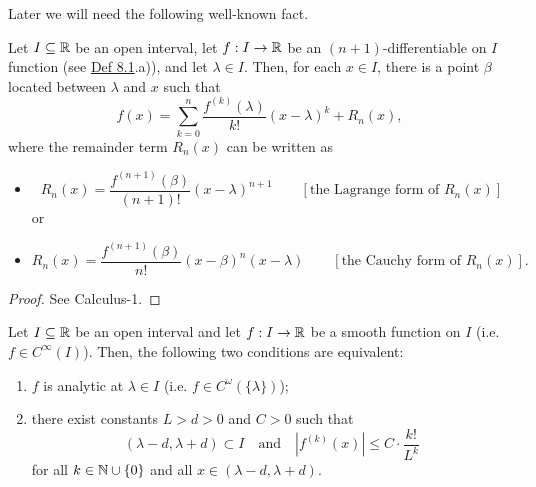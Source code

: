 Later we will need the following well-known fact.

\begin{claim}\label{claim:8.3}
Let $I\subseteq\mathbb{R}$ be an open interval, let $f:I\to\mathbb{R}$ be an $(n+1)$-differentiable on $I$ function (see \hyperref[def:8.1]{Def 8.1}.a)), and let $\lambda\in I$.
Then, for each $x\in I$, there is a point $\beta$ located between $\lambda$ and $x$ such that
\[
f(x)=\sum_{k=0}^{n}\frac{f^{(k)}(\lambda)}{k!}(x-\lambda)^k+R_n(x),
\tag{5}\label{eq:8:5:1}
\]
where the remainder term $R_n(x)$ can be written as
\begin{itemize}
    \item
    \[
    R_n(x)=\frac{f^{(n+1)}(\beta)}{(n+1)!}(x-\lambda)^{n+1}
    \qquad [\text{the Lagrange form of }R_n(x)]
    \]
    or
    \item
    \[
    R_n(x)=\frac{f^{(n+1)}(\beta)}{n!}(x-\beta)^n(x-\lambda)
    \qquad [\text{the Cauchy form of }R_n(x)].
    \]
\end{itemize}
\end{claim}

\begin{proof}
See Calculus-1.
\end{proof}

\begin{claim}\label{claim:8.4}
Let $I\subseteq\mathbb{R}$ be an open interval and let $f:I\to\mathbb{R}$ be a smooth function on $I$ (i.e. $f\in C^\infty(I)$).
Then, the following two conditions are equivalent:
\begin{enumerate}
    \item\label{item:claim:8.4:1} $f$ is analytic at $\lambda\in I$ (i.e. $f\in C^\omega(\{\lambda\})$);
    \item\label{item:claim:8.4:2} there exist constants $L>d>0$ and $C>0$ such that
    \[
    (\lambda-d,\lambda+d)\subset I
    \quad\text{and}\quad
    |f^{(k)}(x)|\leq C\cdot\frac{k!}{L^k}
    \]
    for all $k\in\mathbb{N}\cup\{0\}$ and all $x\in(\lambda-d,\lambda+d)$.
\end{enumerate}
\end{claim}

